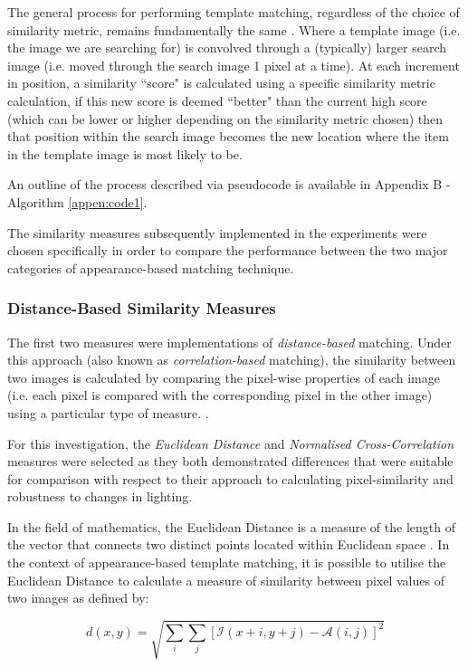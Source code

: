 The general process for performing template matching, regardless of the choice of similarity metric, remains fundamentally the same \cite{opencvtemplatematching}. Where a template image (i.e. the image we are searching for) is convolved through a (typically) larger search image (i.e. moved through the search image 1 pixel at a time). At each increment in position, a similarity ``score" is calculated using a specific similarity metric calculation, if this new score is deemed ``better" than the current high score (which can be lower or higher depending on the similarity metric chosen) then that position within the search image becomes the new location where the item in the template image is most likely to be.

An outline of the process described via pseudocode is available in Appendix B - Algorithm \ref{appen:code1}.

The similarity measures subsequently implemented in the experiments were chosen specifically in order to compare the performance between the two major categories of appearance-based matching technique. 

\subsubsection{Distance-Based Similarity Measures}

The first two measures were implementations of \textit{distance-based} matching. Under this approach (also known as \textit{correlation-based} matching), the similarity between two images is calculated by comparing the pixel-wise properties of each image (i.e. each pixel is compared with the corresponding pixel in the other image) using a particular type of measure. \cite{szeliski}. 

For this investigation, the \textit{Euclidean Distance} and \textit{Normalised Cross-Correlation} measures were selected as they both demonstrated differences that were suitable for comparison with respect to their approach to calculating pixel-similarity and robustness to changes in lighting. 

In the field of mathematics, the Euclidean Distance is a measure of the length of the vector that connects two distinct points located within Euclidean space \cite{szeliski}. In the context of appearance-based template matching, it is possible to utilise the Euclidean Distance to calculate a measure of similarity between pixel values of two images as defined by:

\begin{equation}
d(x, y) = \sqrt{\sum\limits_{i}\sum\limits_{j}[\mathcal{I}(x + i, y + j) - \mathcal{A}(i, j)]^2}
\end{equation}

